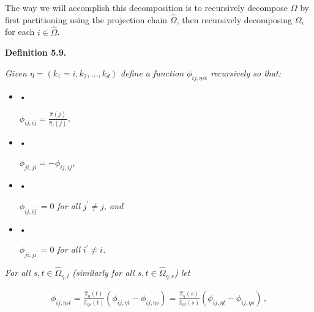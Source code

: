 \documentclass[10pt,a4paper]{article}
\begin{document}
The way we will accomplish this decomposition is to recursively decompose $\Omega$ by first partitioning using the projection chain $\hat{\Omega}$, then recursively decomposing $\Omega_{i}$ for each $i\in\hat{\Omega}$.\par





\par\medskip\noindent\textbf{\textbf{Definition 5.9}\textbf{.}}\par



\emph{Given $\eta=(k_{1}=i,k_{2},\dots,k_{d})$ define a function $\phi_{ij,\eta st}$ recursively so that:}\par


\begin{itemize}


\item[] • 


$\phi_{ij,ij}=\frac{\hat{\pi}(j)}{\hat{\pi}_{i}(j)}$\emph{\thinspace{},}\par




\item[] • 


$\phi_{ji,ji}=-\phi_{ij,ij}$\emph{\thinspace{},}\par




\item[] • 


$\phi_{ij,ij^{\prime}}=0$\emph{ for all }$j^{\prime}\neq j$\emph{, and}\par




\item[] • 


$\phi_{ji,ji^{\prime}}=0$\emph{ for all }$i^{\prime}\neq i$\emph{\thinspace{}.}\par




\end{itemize}




\emph{For all $s,t\in\hat{\Omega}_{\eta,l}$ (similarly for all $s,t\in\hat{\Omega}_{\eta,r}$) let}\par


\[\begin{gathered}
\displaystyle\phi_{ij,\eta st}=\frac{\hat{\pi}_{\eta}(t)}{\hat{\pi}_{\eta s}(t)}(\phi_{ij,\eta t}-\phi_{ij,\eta s})=\frac{\hat{\pi}_{\eta}(s)}{\hat{\pi}_{\eta t}(s)}(\phi_{ij,\eta t}-\phi_{ij,\eta s})\,,
\end{gathered}\]
\end{document}
